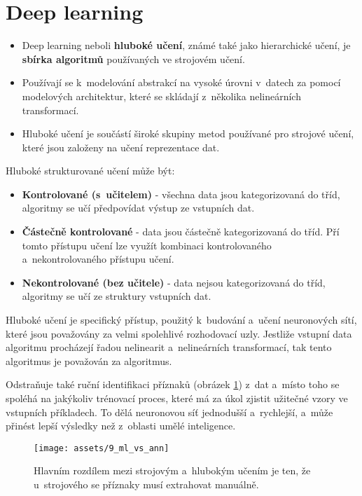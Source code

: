 \section{Deep learning}
\begin{itemize}
    \item Deep learning neboli \textbf{hluboké učení}, známé také jako hierarchické učení, je \textbf{sbírka algoritmů} používaných ve strojovém učení.
    \item Používají se k~modelování abstrakcí na vysoké úrovni v~datech za pomocí modelových architektur, které se skládají z~několika nelineárních transformací.
    \item Hluboké učení je součástí široké skupiny metod používané pro strojové učení, které jsou založeny na učení reprezentace dat.
\end{itemize}
Hluboké strukturované učení může být:
\begin{itemize}
    \item{\textbf{Kontrolované (s~učitelem)} - všechna data jsou kategorizovaná do tříd, algoritmy se učí předpovídat výstup ze vstupních dat.}
    \item{\textbf{Částečně kontrolované} - data jsou částečně kategorizovaná do tříd. Pří tomto přístupu učení lze využít kombinaci kontrolovaného a~nekontrolovaného přístupu učení.}
    \item{\textbf{Nekontrolované (bez učitele)} - data nejsou kategorizovaná do tříd, algoritmy se učí ze struktury vstupních dat.}
\end{itemize}
Hluboké učení je specifický přístup, použitý k~budování a~učení neuronových sítí, které jsou považovány za velmi spolehlivé rozhodovací uzly. Jestliže vstupní data algoritmu procházejí řadou nelinearit a~nelineárních transformací, tak tento algoritmus je považován za  algoritmus.

Odstraňuje také ruční identifikaci příznaků (obrázek \ref{fig:ml_vs_ann}) z~dat a~místo toho se spoléhá na jakýkoliv trénovací proces, které má za úkol zjistit užitečné vzory ve vstupních příkladech. To dělá neuronovou síť jednodušší a~rychlejší, a~může přinést lepší výsledky než z~oblasti umělé inteligence.

\begin{figure}[H]
    \centering
    \texttt{[image: assets/9\_ml\_vs\_ann]}
    \caption{Hlavním rozdílem mezi strojovým a~hlubokým učením je ten, že u~strojového se příznaky musí extrahovat manuálně.}
    \label{fig:ml_vs_ann}
\end{figure}

